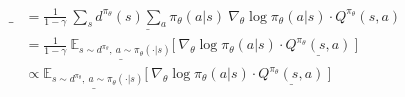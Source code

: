 \begin{align}
\_ &= \frac{1}{1 - \gamma} \ \underline{\sum_{s} d^{\pi_\theta}(s) \sum_{a} \pi_\theta(a|s)} \ \nabla_\theta \log \pi_\theta(a|s) \cdot Q^{\pi_\theta}(s, a) \\
&= \frac{1}{1 - \gamma} \ \underline{\mathbb{E}_{s \sim d^{\pi_\theta},\ a \sim \pi_\theta(\cdot|s)}} \Big\lbrack\ \nabla_\theta\log \pi_\theta(a|s)\cdot \underline{Q^{\pi_\theta}(s, a)} \ \Big\rbrack \\
&\propto \underline{\mathbb{E}_{s \sim d^{\pi_\theta},\ a \sim \pi_\theta(\cdot|s)}} \Big\lbrack\ \nabla_\theta\log \pi_\theta(a|s)\cdot \underline{Q^{\pi_\theta}(s, a)} \ \Big\rbrack
\end{align}